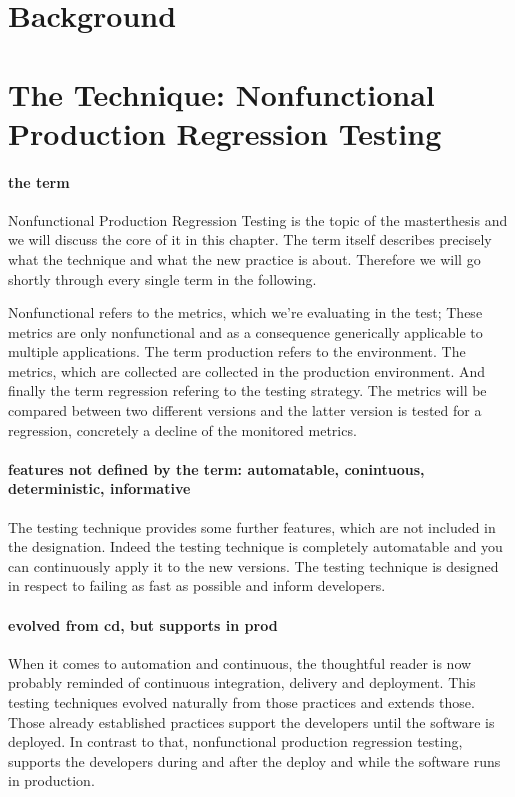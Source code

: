 \chapter{Background}

\chapter{The Technique: Nonfunctional Production Regression Testing}

\subsubsection{the term}
Nonfunctional Production Regression Testing is the topic of the masterthesis and we will
discuss the core of it in this chapter. The term itself describes precisely what the
technique and what the new practice is about. Therefore we will go shortly through every
single term in the following.

Nonfunctional refers to the metrics, which we're evaluating in the test; These metrics are
only nonfunctional and as a consequence generically applicable to multiple
applications. The term production refers to the environment. The metrics, which are
collected are collected in the production environment. And finally the term regression
refering to the testing strategy. The metrics will be compared between two different
versions and the latter version is tested for a regression, concretely a decline of the
monitored metrics.

\subsubsection{features not defined by the term: automatable, conintuous, deterministic, informative}
The testing technique provides some further features, which are not included in the
designation. Indeed the testing technique is completely automatable and you can
continuously apply it to the new versions. The testing technique is designed in respect to
failing as fast as possible and inform developers.

\subsubsection{evolved from cd, but supports in prod}
When it comes to automation and continuous, the thoughtful reader is now probably reminded
of continuous integration, delivery and deployment. This testing techniques evolved
naturally from those practices and extends those. Those already established practices
support the developers until the software is deployed. In contrast to that, nonfunctional
production regression testing, supports the developers during and after the deploy and
while the software runs in production.


